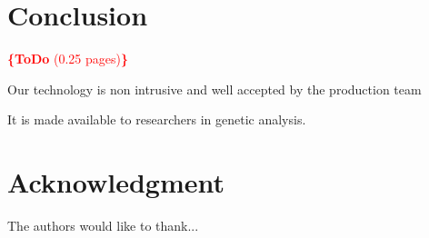 \documentclass[conference]{IEEEtran}
\newcommand{\todo}[1]{\noindent\textcolor{red}{{\bf \{ToDo} #1{\bf \}}}}
\begin{document}
\section{Conclusion}
\todo{(0.25 pages)}

Our technology is non intrusive and well accepted by the production team

It is made available to researchers in genetic analysis.




 

\section*{Acknowledgment}

The authors would like to thank...













\end{document}
